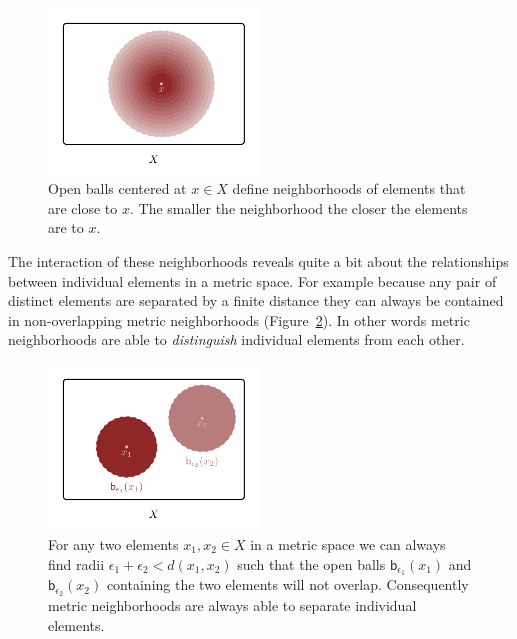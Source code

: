 \documentclass[
  letterpaper,
  DIV=11,
  numbers=noendperiod]{scrartcl}
\begin{document}
\begin{figure}

{\centering \includegraphics[width=0.5\textwidth,height=\textheight]{figures/structures/metric_topology/continuous_neighborhoods/continuous_neighborhoods.pdf}

}

\caption{\label{fig-metric-continuous-neighborhoods}Open balls centered
at \(x \in X\) define neighborhoods of elements that are close to \(x\).
The smaller the neighborhood the closer the elements are to \(x\).}

\end{figure}

The interaction of these neighborhoods reveals quite a bit about the
relationships between individual elements in a metric space. For example
because any pair of distinct elements are separated by a finite distance
they can always be contained in non-overlapping metric neighborhoods
(Figure~\ref{fig-metric-separation}). In other words metric
neighborhoods are able to \emph{distinguish} individual elements from
each other.

\begin{figure}

{\centering \includegraphics[width=0.5\textwidth,height=\textheight]{figures/structures/metric_topology/separation/separation.pdf}

}

\caption{\label{fig-metric-separation}For any two elements
\(x_{1}, x_{2} \in X\) in a metric space we can always find radii
\(\epsilon_{1} + \epsilon_{2} < d(x_{1}, x_{2})\) such that the open
balls \(\mathsf{b}_{\epsilon_{1}}(x_{1})\) and
\(\mathsf{b}_{\epsilon_{2}}(x_{2})\) containing the two elements will
not overlap. Consequently metric neighborhoods are always able to
separate individual elements.}

\end{figure}
\end{document}
